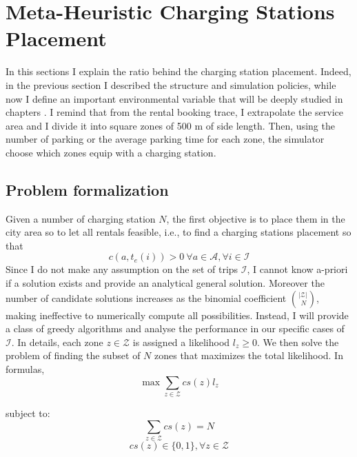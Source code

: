 \section{Meta-Heuristic Charging Stations Placement}
\label{sec:5_3_mh_placement}
In this sections I explain the ratio behind the charging station placement. Indeed, in the previous section I described the structure and simulation policies, while now I define an important environmental variable that will be deeply studied in chapters . I remind that from the rental booking trace, I extrapolate the service area and I divide it into square zones of 500 m of side length. Then, using the number of parking or the average parking time for each zone, the simulator choose which zones equip with a charging station.

\subsection{Problem formalization}
Given a number of charging station $N$, the first objective is to place them in the city area so to let all rentals feasible, i.e., to find a charging stations placement so that
\[
c(a,t_e(i))>0\ \forall a \in \mathcal{A}, \forall  i \in \mathcal{I}
\]
Since I do not make any assumption on the set of trips $\mathcal{I}$, I cannot know a-priori if a solution exists and provide an analytical general solution. Moreover the number of candidate solutions increases as the binomial coefficient ${\left\vert{\mathcal{Z}}\right\vert}\choose\ N$, making ineffective to numerically compute all possibilities. Instead, I will provide a class of greedy algorithms and analyse the performance in our specific cases of $\mathcal{I}$.
In details, each zone $z\in\mathcal{Z}$ is assigned a likelihood $l_z \geq 0$.
We then solve the problem of finding the subset of $N$ zones that maximizes the total likelihood. In formulas, 
$$\max \sum_{z\in\mathcal{Z}} cs(z)l_z$$

subject to:
$$\sum_{z\in\mathcal{Z}} cs(z) = N$$
$$cs(z)\in \{0,1\},  \forall z \in \mathcal{Z}$$

